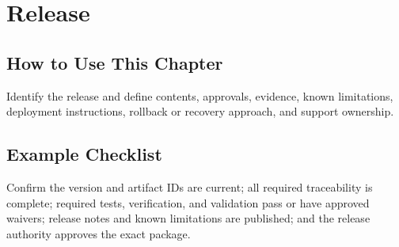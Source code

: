 \chapter{Release}
\section{How to Use This Chapter}
Identify the release and define contents, approvals, evidence, known limitations, deployment instructions, rollback or recovery approach, and support ownership.
\section{Example Checklist}
Confirm the version and artifact IDs are current; all required traceability is complete; required tests, verification, and validation pass or have approved waivers; release notes and known limitations are published; and the release authority approves the exact package.

